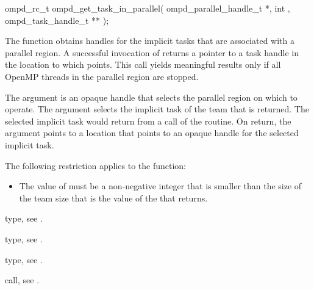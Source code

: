 \format
\begin{cspecific}
\begin{ompSyntax}
ompd_rc_t ompd_get_task_in_parallel(
  ompd_parallel_handle_t *,
  int ,
  ompd_task_handle_t **
);
\end{ompSyntax}
\end{cspecific}

\descr
The  function obtains handles for
the implicit tasks that are associated with a parallel region. A 
successful invocation of   returns 
a pointer to a task handle in the location to which 
points. This call yields meaningful results only if all OpenMP threads 
in the parallel region are stopped.

\argdesc
The  argument is an opaque handle that selects the 
parallel region on which to operate. The  argument selects 
the implicit task of the team that is returned. The selected implicit task 
would return  from a call of the  
routine. On return, the  argument points to a location 
that points to an opaque handle for the selected implicit task.

\restrictions

The following restriction applies to the  function:

\begin{itemize}
\item The value of  must be a non-negative integer that is 
      smaller than the size of the team size that is the value of the 
       that  returns.
\end{itemize}

\begin{crossrefs}
\item {} type, 
see .

\item {} type, see .

\item {} type, see .

\item {} call, 
see .
\end{crossrefs}



